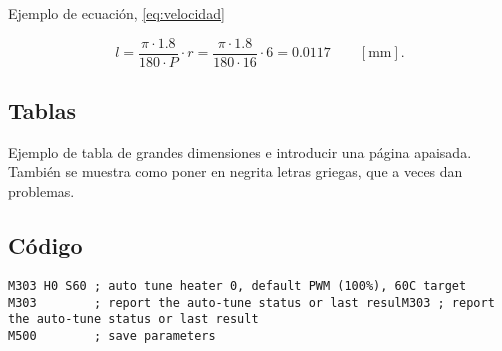 Ejemplo de ecuación, \autoref{eq:velocidad}

\begin{equation}\label{eq:velocidad}
	l = \frac{\pi\cdot1.8}{180\cdot P}\cdot r = \frac{\pi\cdot1.8}{180\cdot16}\cdot 6 = 0.0117 \qquad [\mathrm{mm}].
\end{equation}




\subsection{Tablas}

Ejemplo de tabla de grandes dimensiones e introducir una página apaisada. También se muestra como poner en negrita letras griegas, que a veces dan problemas.

\begin{landscape}
    \vspace*{\fill}
    
    \vspace*{\fill}
    \clearpage
\end{landscape}



\subsection{Código}


\begin{lstlisting}
M303 H0 S60 ; auto tune heater 0, default PWM (100%), 60C target
M303        ; report the auto-tune status or last resulM303 ; report the auto-tune status or last result
M500        ; save parameters
\end{lstlisting}




